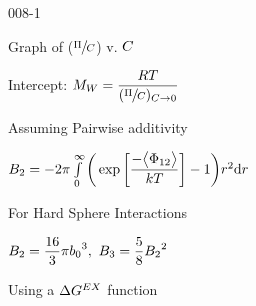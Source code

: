 \begin{mitframe}{008-1}
\begin{listone}
\begin{listtwo}
\begin{listthree}
\begin{listfour}
\begin{listfive}
					\item Graph of ($\sfrac{\osmpress}{\conc}$) v. $\conc$
					
                    \begin{listsix}
                    
						\item Intercept: $\mw = \dfrac{\gasconst\Temp}{(\sfrac{\osmpress}{\conc})_{\conc\rightarrow\init}}$
    					
                     \end{listsix}
                     
				\end{listfive}
                
			\end{listfour}
            
			\item Assuming Pairwise additivity
            
			\begin{listfour}
            
				\item $\virialcoeff{2} = -2\pi\int\limits_{\init}^{\infty}\bigg(\exp\bigg[\dfrac{-\big\langle\pot_{12}\big\rangle}{\thermcond\Temp}\bigg]-1\bigg)\pos^2 \mathrm{d}\pos$
				
                \item For Hard Sphere Interactions
				
                \begin{listfive}
					
                    \item $\virialcoeff{2} = \dfrac{16}{3}\pie {b_{\init}}^3,~\virialcoeff{3} = \dfrac{5}{8} {\virialcoeff{2}}^2 $
		
                    
				\end{listfive}
                
			\end{listfour}
            
			\item Using a $\iipf\gibbs^{\exfunc}$ function
            
        
            

\end{listthree}
\end{listtwo}
\end{listone}
\end{mitframe}
